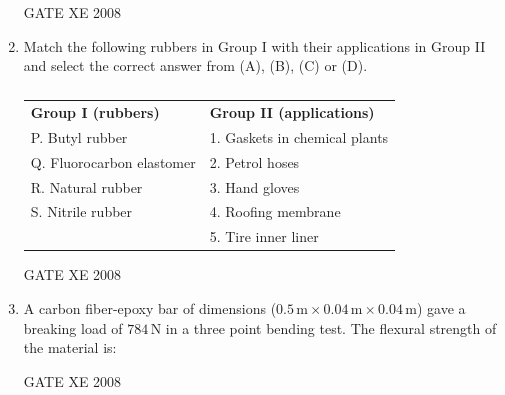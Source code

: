 \documentclass[12pt]{article}
\begin{document}
\begin{enumerate}[label=Q\arabic*.]
GATE XE 2008

\item Match the following rubbers in Group I with their applications in Group II and select the correct answer from (A), (B), (C) or (D).

\begin{table}[H]     \centering     \caption{}     \label{}     \begin{tabular}{l l}
\textbf{Group I (rubbers)} & \textbf{Group II (applications)} \\
P. Butyl rubber & 1. Gaskets in chemical plants \\
Q. Fluorocarbon elastomer & 2. Petrol hoses \\
R. Natural rubber & 3. Hand gloves \\
S. Nitrile rubber & 4. Roofing membrane \\
& 5. Tire inner liner \\
\end{tabular} \end{table}

\begin{enumerate}[label=(\Alph*)]
\end{enumerate}

GATE XE 2008

\item A carbon fiber-epoxy bar of dimensions ($0.5\,\mathrm{m} \times 0.04\,\mathrm{m} \times 0.04\,\mathrm{m}$) gave a breaking load of $784\,\mathrm{N}$ in a three point bending test. The flexural strength of the material is:

\begin{enumerate}[label=(\Alph*)]
\end{enumerate}

GATE XE 2008


\end{enumerate}
\end{document}
